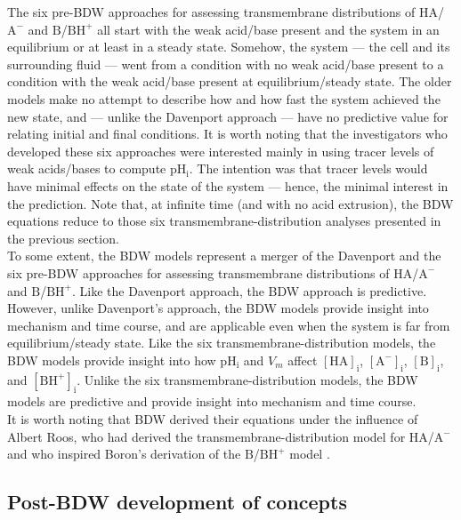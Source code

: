 \documentclass[fleqn,10pt]{physiome}
\begin{document}
The six pre-BDW approaches for assessing transmembrane distributions of $\mathrm{HA}$/$\mathrm{A^-}$ and $\mathrm{B}$/$\mathrm{BH^+}$ all start with the weak acid/base present and the system in an equilibrium or at least in a steady state. Somehow, the system --- the cell and its surrounding fluid --- went from a condition with no weak acid/base present to a condition with the weak acid/base present at equilibrium/steady state. The older models make no attempt to describe how and how fast the system achieved the new state, and --- unlike the Davenport approach --- have no predictive value for relating initial and final conditions. It is worth noting that the investigators who developed these six approaches were interested mainly in using tracer levels of weak acids/bases to compute $\mathrm{pH_i}$. The intention was that tracer levels would have minimal effects on the state of the system --- hence, the minimal interest in the prediction. Note that, at infinite time (and with no acid extrusion), the BDW equations reduce to those six transmembrane-distribution analyses presented in the previous section.\\

To some extent, the BDW models represent a merger of the Davenport and the six pre-BDW approaches for assessing transmembrane distributions of $\mathrm{HA}$/$\mathrm{A^-}$ and $\mathrm{B}$/$\mathrm{BH^+}$. Like the Davenport approach, the BDW approach is predictive. However, unlike Davenport's approach, the BDW models provide insight into mechanism and time course, and are applicable even when the system is far from equilibrium/steady state. Like the six transmembrane-distribution models, the BDW models provide insight into how $\mathrm{pH_i}$ and $V_m$ affect $\mathrm{[HA]_i}$, $\mathrm{[A^-]_i}$, $\mathrm{[B]_i}$, and $\mathrm{[BH^+]_i}$. Unlike the six transmembrane-distribution models, the BDW models are predictive and provide insight into mechanism and time course.\\

It is worth noting that BDW derived their equations under the influence of Albert Roos, who had derived the transmembrane-distribution model for $\mathrm{HA}$/$\mathrm{A^-}$ \citep{roos1975intracellular} and who inspired Boron's derivation of the $\mathrm{B}$/$\mathrm{BH^+}$ model \citep{boron1976comparison}.

\subsection{Post-BDW development of concepts}
\end{document}
